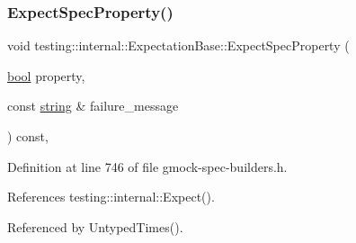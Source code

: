 \subsubsection{\texorpdfstring{Expect\+Spec\+Property()}{ExpectSpecProperty()}}
{\footnotesize\ttfamily void testing\+::internal\+::\+Expectation\+Base\+::\+Expect\+Spec\+Property (\begin{DoxyParamCaption}\item[{\hyperlink{classbool}{bool}}]{property,  }\item[{const \hyperlink{namespacetesting_1_1internal_a8e8ff5b11e64078831112677156cb111}{string} \&}]{failure\+\_\+message }\end{DoxyParamCaption}) const\hspace{0.3cm}{\ttfamily [inline]}, {\ttfamily [protected]}}



Definition at line 746 of file gmock-\/spec-\/builders.\+h.



References testing\+::internal\+::\+Expect().



Referenced by Untyped\+Times().



